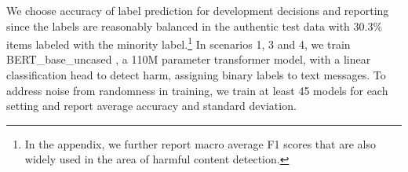 We choose accuracy of label prediction for development decisions and reporting since the labels are reasonably balanced in the authentic test data with 30.3\% items labeled with the minority
label.\footnote{In the appendix, we further report macro average F1 scores that are also widely used in the area of harmful content detection.}
In scenarios 1, 3 and 4,
we train BERT\_base\_uncased \cite{devlin-etal-2019-bert}, a 110M parameter transformer model, with a linear classification head
to detect harm, assigning binary labels to text messages.
To address noise from randomness in training, we train at least 45 models for each setting and report average accuracy and standard deviation.